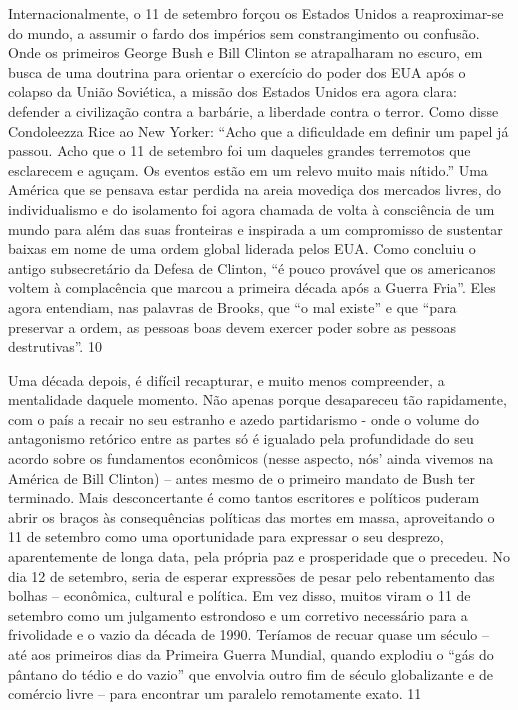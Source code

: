 \par
 
Internacionalmente, o 11 de setembro forçou os Estados Unidos a reaproximar-se do mundo, a assumir o fardo dos impérios sem constrangimento ou confusão. Onde os primeiros George Bush e Bill Clinton se atrapalharam no escuro, em busca de uma doutrina para orientar o exercício do poder dos EUA após o colapso da União Soviética, a missão dos Estados Unidos era agora clara: defender a civilização contra a barbárie, a liberdade contra o terror. Como disse Condoleezza Rice ao New Yorker: “Acho que a dificuldade em definir um papel já passou. Acho que o 11 de setembro foi um daqueles grandes terremotos que esclarecem e aguçam. Os eventos estão em um relevo muito mais nítido.” Uma América que se pensava estar perdida na areia movediça dos mercados livres, do individualismo e do isolamento foi agora chamada de volta à consciência de um mundo para além das suas fronteiras e inspirada a um compromisso de sustentar baixas em nome de uma ordem global liderada pelos EUA. Como concluiu o antigo subsecretário da Defesa de Clinton, “é pouco provável que os americanos voltem à complacência que marcou a primeira década após a Guerra Fria”. Eles agora entendiam, nas palavras de Brooks, que “o mal existe” e que “para preservar a ordem, as pessoas boas devem exercer poder sobre as pessoas destrutivas”.
 {\color{blue} 10}  

 
\par
 
Uma década depois, é difícil recapturar, e muito menos compreender, a mentalidade daquele momento. Não apenas porque desapareceu tão rapidamente, com o país a recair no seu estranho e azedo partidarismo - onde o volume do antagonismo retórico entre as partes só é igualado pela profundidade do seu acordo sobre os fundamentos econômicos (nesse aspecto, nós' ainda vivemos na América de Bill Clinton) – antes mesmo de o primeiro mandato de Bush ter terminado. Mais desconcertante é como tantos escritores e políticos puderam abrir os braços às consequências políticas das mortes em massa, aproveitando o 11 de setembro como uma oportunidade para expressar o seu desprezo, aparentemente de longa data, pela própria paz e prosperidade que o precedeu. No dia 12 de setembro, seria de esperar expressões de pesar pelo rebentamento das bolhas – econômica, cultural e política. Em vez disso, muitos viram o 11 de setembro como um julgamento estrondoso e um corretivo necessário para a frivolidade e o vazio da década de 1990. Teríamos de recuar quase um século – até aos primeiros dias da Primeira Guerra Mundial, quando explodiu o “gás do pântano do tédio e do vazio” que envolvia outro fim de século globalizante e de comércio livre – para encontrar um paralelo remotamente exato.
 {\color{blue} 11}  

